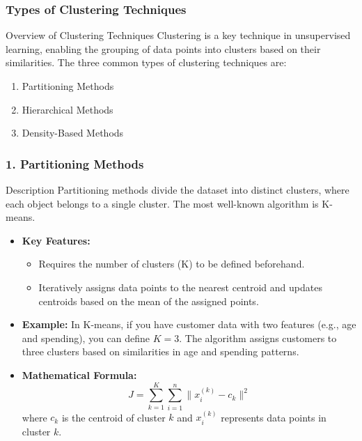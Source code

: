 \documentclass[aspectratio=169]{beamer}
\begin{document}
\begin{frame}[fragile]
    \frametitle{Types of Clustering Techniques}
    
    \begin{block}{Overview of Clustering Techniques}
        Clustering is a key technique in unsupervised learning, enabling the grouping of data points into clusters based on their similarities. The three common types of clustering techniques are:
    \end{block}

    \begin{enumerate}
        \item Partitioning Methods
        \item Hierarchical Methods
        \item Density-Based Methods
    \end{enumerate}
\end{frame}

\begin{frame}[fragile]
    \frametitle{1. Partitioning Methods}
    
    \begin{block}{Description}
        Partitioning methods divide the dataset into distinct clusters, where each object belongs to a single cluster. The most well-known algorithm is K-means.
    \end{block}

    \begin{itemize}
        \item \textbf{Key Features:}
        \begin{itemize}
            \item Requires the number of clusters (K) to be defined beforehand.
            \item Iteratively assigns data points to the nearest centroid and updates centroids based on the mean of the assigned points.
        \end{itemize}
        
        \item \textbf{Example:} In K-means, if you have customer data with two features (e.g., age and spending), you can define \( K=3 \). The algorithm assigns customers to three clusters based on similarities in age and spending patterns.
        
        \item \textbf{Mathematical Formula:} 
        \begin{equation}
            J = \sum_{k=1}^{K} \sum_{i=1}^{n} \| x_i^{(k)} - c_k \|^2
        \end{equation}
        where \( c_k \) is the centroid of cluster \( k \) and \( x_i^{(k)} \) represents data points in cluster \( k \).
    \end{itemize}
\end{frame}
\end{document}
